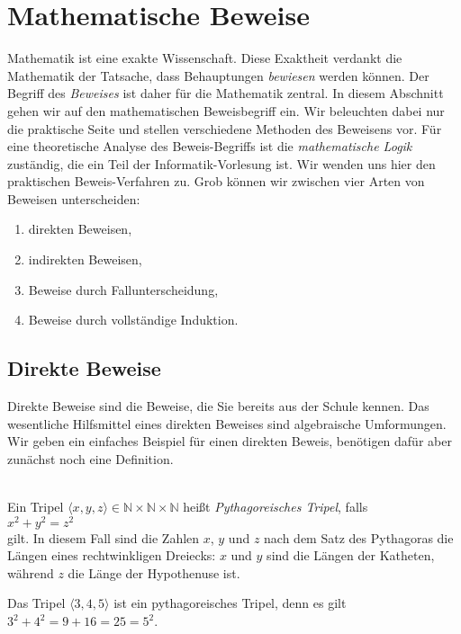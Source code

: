 \chapter{Mathematische Beweise}
Mathematik ist eine exakte Wissenschaft. Diese Exaktheit verdankt die Mathematik der
Tatsache, dass Behauptungen \emph{bewiesen} werden können.  Der Begriff des \emph{Beweises} 
ist daher für die Mathematik zentral.  
In diesem Abschnitt gehen wir auf den mathematischen Beweisbegriff ein.  Wir beleuchten dabei nur die
praktische Seite und stellen verschiedene Methoden des Beweisens vor.  Für eine theoretische Analyse des
Beweis-Begriffs ist die \emph{mathematische Logik} zuständig, die ein Teil der Informatik-Vorlesung ist.
Wir wenden uns hier den praktischen Beweis-Verfahren zu.
Grob können wir zwischen vier Arten von Beweisen unterscheiden:
\begin{enumerate}
\item direkten Beweisen,
\item indirekten Beweisen,
\item Beweise durch Fallunterscheidung, 
\item Beweise durch vollständige Induktion.
\end{enumerate}

\section{Direkte Beweise}
Direkte Beweise sind die Beweise, die Sie bereits aus der Schule kennen.  Das wesentliche Hilfsmittel eines direkten Beweises
sind algebraische Umformungen.  Wir geben ein einfaches Beispiel für einen
direkten Beweis, benötigen dafür aber zunächst noch eine Definition.


\begin{Definition} \hspace*{\fill} \\
Ein Tripel $\langle x, y, z \rangle \in \mathbb{N}\!\times\!\mathbb{N}\!\times\!\mathbb{N}$ heißt
\emph{Pythagoreisches Tripel}, falls
\\[0.2cm]
\hspace*{1.3cm}
$x^2 + y^2 = z^2$
\\[0.2cm]
gilt.  In diesem Fall sind die Zahlen $x$, $y$ und $z$ nach dem Satz des Pythagoras die Längen eines
rechtwinkligen Dreiecks:  $x$ und $y$ sind die Längen der Katheten, während $z$ die Länge der Hypothenuse
ist.
\end{Definition}

\example
Das Tripel $\langle 3, 4, 5 \rangle$ ist ein pythagoreisches Tripel, denn es gilt
\\[0.2cm]
\hspace*{1.3cm}
$3^2 + 4^2 = 9 + 16 = 25 = 5^2$. \eox


